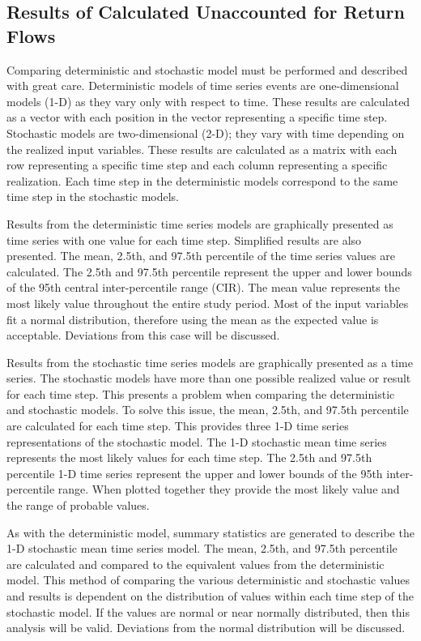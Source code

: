 \begin{linenumbers}
\section{Results of Calculated Unaccounted for Return Flows}
\label{sec:WaterModelResults}
Comparing deterministic and stochastic model must be performed and described with great care.  Deterministic models of time series events are one-dimensional models (1-D) as they vary only with respect to time.  These results are calculated as a vector with each position in the vector representing a specific time step.  Stochastic models are two-dimensional (2-D); they vary with time depending on the realized input variables.  These results are calculated as a matrix with each row representing a specific time step and each column representing a specific realization.  Each time step in the deterministic models correspond to the same time step in the stochastic models.

Results from the deterministic time series models are graphically presented as time series with one value for each time step.  Simplified results are also presented.  The mean, 2.5th, and 97.5th percentile of the time series values are calculated.  The 2.5th and 97.5th percentile represent the upper and lower bounds of the 95th central inter-percentile range (CIR).  The mean value represents the most likely value throughout the entire study period. Most of the input variables fit a normal distribution, therefore using the mean as the expected value is acceptable.  Deviations from this case will be discussed.

Results from the stochastic time series models are graphically presented as a time series.  The stochastic models have more than one possible realized value or result for each time step.  This presents a problem when comparing the deterministic and stochastic models.  To solve this issue, the mean, 2.5th, and 97.5th percentile are calculated for each time step.  This provides three 1-D time series representations of the stochastic model.  The 1-D stochastic mean time series represents the most likely values for each time step.  The 2.5th and 97.5th percentile 1-D time series represent the upper and lower bounds of the 95th inter-percentile range.  When plotted together they provide the most likely value and the range of probable values.

As with the deterministic model, summary statistics are generated to describe the 1-D stochastic mean time series model.  The mean, 2.5th, and 97.5th percentile are calculated and compared to the equivalent values from the deterministic model.  This method of comparing the various deterministic and stochastic values and results is dependent on the distribution of values within each time step of the stochastic model.  If the values are normal or near normally distributed, then this analysis will be valid.  Deviations from the normal distribution will be discussed.


\end{linenumbers}
